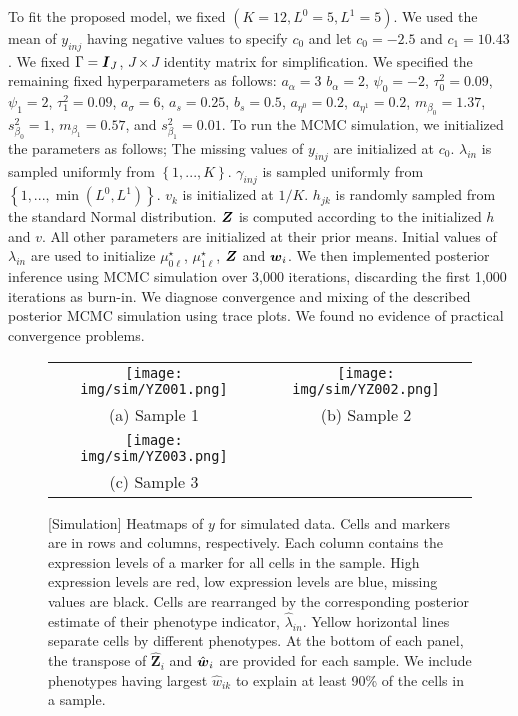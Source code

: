 \documentclass[12pt,]{article}
\newcommand{\bc}[1]{ \left\{#1\right\} }
\def\Z{\bm{Z}}
\newcommand{\bZ}{\mbox{\boldmath $Z$}}
\newcommand{\bw}{\mbox{\boldmath $w$}}
\newcommand{\bI}{\mbox{\boldmath $I$}}
\begin{document}
To fit the proposed model, we fixed $(K=12, L^0=5,
L^1=5)$. We used the mean of $y_{inj}$  having negative values to specify $c_0$
and let $c_0=-2.5$ and $c_1=10.43$. We fixed $\Gamma=\bI_J$,
$J\times J$ identity matrix for simplification. We specified the remaining fixed
hyperparameters as follows:
%
$a_\alpha=3$ $b_\alpha=2$, $\psi_0=-2$, $\tau^2_0=0.09$, $\psi_1=2$,
$\tau^2_1=0.09$, $a_\sigma=6$, $a_s=0.25$, $b_s=0.5$, $a_{\eta^0}=0.2$,
$a_{\eta^1}=0.2$, $m_{\beta_0}=1.37$, $s^2_{\beta_0}=1$,
$m_{\beta_1}=0.57$, and $s^2_{\beta_1}=0.01$.
%
To run the MCMC simulation, we initialized the parameters as follows; The
missing values of $y_{inj}$ are initialized at $c_0$.  $\lambda_{in}$ is
sampled uniformly from $\bc{1,...,K}$.  $\gamma_{inj}$ is sampled uniformly
from $\bc{1,...,\min(L^0,L^1)}$. $v_k$ is initialized at $1/K$. $h_{jk}$ is
randomly sampled from the standard Normal distribution. $\bZ$ is computed
according to the initialized $h$ and $v$. All other parameters are initialized
at their prior means.  Initial values of $\lambda_{in}$ are used to initialize
$\mu^{\star}_{0\ell}$, $\mu^{\star}_{1\ell}$, $\bZ$ and $\bw_i$.  We then
implemented posterior inference using MCMC simulation over 3,000 iterations,
discarding the first 1,000 iterations as burn-in.  We diagnose convergence and
mixing of the described posterior MCMC simulation using trace plots. We found
no evidence of practical convergence problems. 


\begin{figure}[th!]
  \begin{center}
  \begin{tabular}{cc}
  \texttt{[image: img/sim/YZ001.png]}&
  \texttt{[image: img/sim/YZ002.png]}\\
  {\small (a) Sample 1} & {\small(b) Sample 2} \\
  \texttt{[image: img/sim/YZ003.png]}&\\
  {\small (c) Sample 3} & \\
  \end{tabular}
  \end{center}
  \vspace{-0.05in}
  \caption{\small[Simulation]  Heatmaps of $y$ for simulated data. Cells and
    markers are in rows and columns, respectively. Each column contains the
    expression levels of a marker for all cells in the sample. High expression
    levels are red, low expression levels are blue, missing values are black.
    Cells are rearranged by the corresponding posterior estimate of their
    phenotype indicator, $\hat{\lambda}_{in}$.  Yellow horizontal lines separate
    cells by different phenotypes.  At the bottom of each panel, the
    transpose of $\hat{\Z}_i$ and $\hat{\bw}_i$ are provided for each sample.
    We include phenotypes having largest $\hat{w}_{ik}$ to explain at least 90\%
    of the cells in a sample.}
\label{fig:sim-post-Z}
\end{figure}
\end{document}
